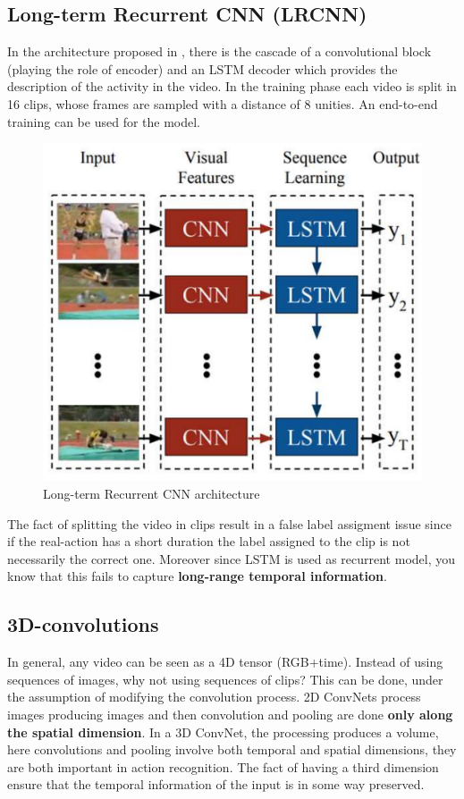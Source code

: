 \subsection{\textsf{Long-term Recurrent CNN (LRCNN)}}
In the architecture proposed in \citeauthor{donahue2015long}, \cite{donahue2015long} there is the cascade of a convolutional block (playing the role of encoder) and an LSTM decoder which provides the description of the activity in the video. In the training phase each video is split in 16 clips, whose frames are sampled with a distance of 8 unities. An end-to-end training can be used for the model.
\begin{figure}[h]
    \centering
    \includegraphics[scale=0.7]{img/LRCNN.png}
    \caption{Long-term Recurrent CNN architecture}
\end{figure}

The fact of splitting the video in clips result in a false label assigment issue since if the real-action has a short duration the label assigned to the clip is not necessarily the correct one. Moreover since LSTM is used as recurrent model, you know that this fails to capture \textbf{long-range temporal information}.

\subsection{\textsf{3D-convolutions}}
In general, any video can be seen as a 4D tensor (RGB+time). Instead of using sequences of images, why not using sequences of clips? This can be done, under the assumption of modifying the convolution process. 2D ConvNets process images producing images and then convolution and pooling are done \textbf{only along the spatial dimension}. In a 3D ConvNet, the processing produces a volume, here convolutions and pooling involve both temporal and spatial dimensions, they are both important in action recognition. The fact of having a third dimension ensure that the temporal information of the input is in some way preserved.


